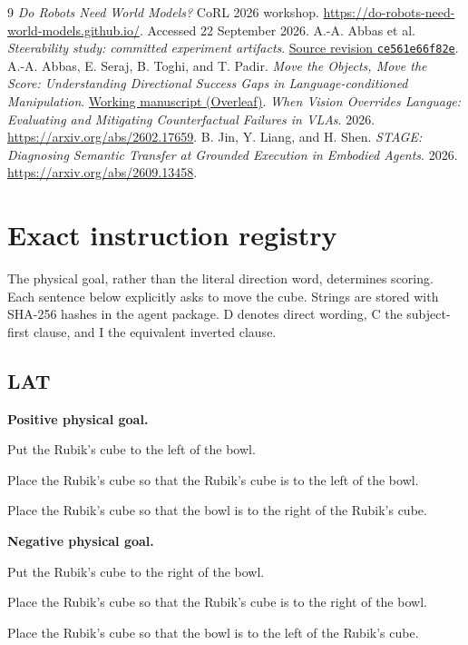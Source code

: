 \documentclass[11pt]{article}
\begin{document}
\begingroup\footnotesize\raggedright
\begin{thebibliography}{9}
 \emph{Do Robots Need World Models?} CoRL 2026 workshop. \url{https://do-robots-need-world-models.github.io/}. Accessed 22 September 2026.
 A.-A. Abbas et al. \emph{Steerability study: committed experiment artifacts}. \href{https://github.com/adeeb10abbas/steerable/tree/ce561e66f82e95055e39d3d7711691982f6b2086}{Source revision \texttt{ce561e66f82e}}.
 A.-A. Abbas, E. Seraj, B. Toghi, and T. Padir. \emph{Move the Objects, Move the Score: Understanding Directional Success Gaps in Language-conditioned Manipulation}. \href{https://www.overleaf.com/project/6a82672ecde49ed541431887}{Working manuscript (Overleaf)}.
 \emph{When Vision Overrides Language: Evaluating and Mitigating Counterfactual Failures in VLAs}. 2026. \url{https://arxiv.org/abs/2602.17659}.
 B. Jin, Y. Liang, and H. Shen. \emph{STAGE: Diagnosing Semantic Transfer at Grounded Execution in Embodied Agents}. 2026. \url{https://arxiv.org/abs/2609.13458}.
\end{thebibliography}
\endgroup

\clearpage\appendix
\section{Exact instruction registry}\label{app:prompts}
The physical goal, rather than the literal direction word, determines scoring. Each sentence below explicitly asks to move the cube. Strings are stored with SHA-256 hashes in the agent package. D denotes direct wording, C the subject-first clause, and I the equivalent inverted clause.

\subsection*{LAT}
\textbf{Positive physical goal.}\par
\begin{description}[font=\normalfont\bfseries]
\item[D] Put the Rubik's cube to the left of the bowl.
\item[C] Place the Rubik's cube so that the Rubik's cube is to the left of the bowl.
\item[I] Place the Rubik's cube so that the bowl is to the right of the Rubik's cube.
\end{description}
\textbf{Negative physical goal.}\par
\begin{description}[font=\normalfont\bfseries]
\item[D] Put the Rubik's cube to the right of the bowl.
\item[C] Place the Rubik's cube so that the Rubik's cube is to the right of the bowl.
\item[I] Place the Rubik's cube so that the bowl is to the left of the Rubik's cube.
\end{description}
\end{document}
